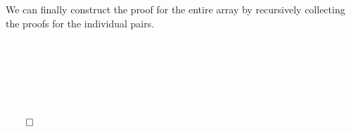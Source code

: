 We can finally construct the proof for the entire array by recursively collecting the proofs for the individual pairs.

\begin{code}
    \>[0]\AgdaSpace{}%
    \AgdaSymbol{:}\AgdaSpace{}%
    \AgdaSymbol{\{}\AgdaSpace{}%
    \AgdaSymbol{:}\AgdaSpace{}%
    \AgdaSymbol{\}}\AgdaSpace{}%
    \AgdaSpace{}%
    \AgdaOperator{\AgdaFunction{φ[}}\AgdaSpace{}%
    \AgdaSpace{}%
    \AgdaSpace{}%
    \AgdaOperator{\AgdaFunction{]}}\AgdaSpace{}%
    \AgdaSpace{}%
    \AgdaSpace{}%
    \AgdaSpace{}%
    \AgdaSpace{}%
    \<%
    \\
    \>[0]\AgdaSpace{}%
    \AgdaSymbol{\{}\AgdaSymbol{\}}\AgdaSpace{}%
    \AgdaSymbol{\{}\AgdaSymbol{\}}\AgdaSpace{}%
    \AgdaInductiveConstructor{[]}\AgdaSpace{}%
    \AgdaSymbol{=}\AgdaSpace{}%
    \<%
    \\
    \>[0]\AgdaSpace{}%
    \AgdaSymbol{\{}\AgdaSpace{}%
    \AgdaSymbol{\}}\AgdaSpace{}%
    \AgdaSymbol{\{}\AgdaSymbol{\}}\AgdaSpace{}%
    \AgdaSymbol{(}\AgdaSpace{}%
    \AgdaSpace{}%
    \AgdaSymbol{)}\AgdaSpace{}%
    \AgdaSymbol{=}\<%
    \\
    \>[0][@{}l@{\AgdaIndent{0}}]%
    \>[2]\AgdaSpace{}%
    \AgdaSymbol{\{}\AgdaSymbol{\}}\AgdaSpace{}%
    \AgdaSymbol{\{}\AgdaSymbol{\}}\AgdaSpace{}%
    \<%
    \\
    \>[2]\AgdaOperator{\AgdaInductiveConstructor{,}}\<%
    \\
    \>[2]\AgdaSymbol{(}\AgdaSpace{}%
    \AgdaSymbol{\{}\AgdaSymbol{\}}\AgdaSpace{}%
    \AgdaSymbol{)}\<%
\end{code}

$\qed$
